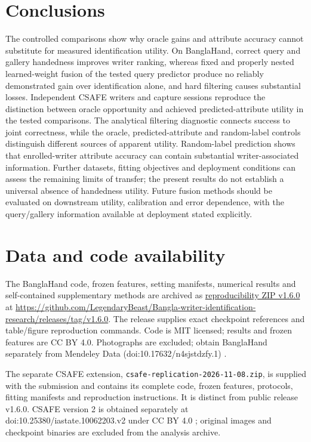 \section{Conclusions}
The controlled comparisons show why oracle gains and attribute accuracy cannot substitute for measured identification utility. On BanglaHand, correct query and gallery handedness improves writer ranking, whereas fixed and properly nested learned-weight fusion of the tested query predictor produce no reliably demonstrated gain over identification alone, and hard filtering causes substantial losses. Independent CSAFE writers and capture sessions reproduce the distinction between oracle opportunity and achieved predicted-attribute utility in the tested comparisons. The analytical filtering diagnostic connects success to joint correctness, while the oracle, predicted-attribute and random-label controls distinguish different sources of apparent utility. Random-label prediction shows that enrolled-writer attribute accuracy can contain substantial writer-associated information. Further datasets, fitting objectives and deployment conditions can assess the remaining limits of transfer; the present results do not establish a universal absence of handedness utility. Future fusion methods should be evaluated on downstream utility, calibration and error dependence, with the query/gallery information available at deployment stated explicitly.

\section*{Data and code availability}
The BanglaHand code, frozen features, setting manifests, numerical results and self-contained supplementary methods are archived as \href{https://github.com/LegendaryBeast/Bangla-writer-identification-research/releases/download/v1.6.0/wid-reproducibility-v1.6.0.zip}{reproducibility ZIP v1.6.0} at \url{https://github.com/LegendaryBeast/Bangla-writer-identification-research/releases/tag/v1.6.0}. The release supplies exact checkpoint references and table/figure reproduction commands. Code is MIT licensed; results and frozen features are CC BY 4.0. Photographs are excluded; obtain BanglaHand separately from Mendeley Data (doi:10.17632/n4sjstdzfy.1) \cite{banglahand2026data}.



 The separate CSAFE extension, \texttt{csafe-replication-2026-11-08.zip}, is supplied with the submission and contains its complete code, frozen features, protocols, fitting manifests and reproduction instructions. It is distinct from public release v1.6.0. CSAFE version 2 is obtained separately at doi:10.25380/iastate.10062203.v2 under CC BY 4.0 \cite{crawford2026csafe}; original images and checkpoint binaries are excluded from the analysis archive.

